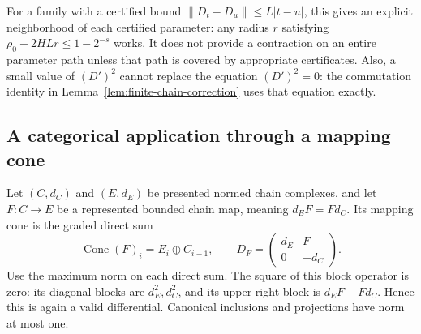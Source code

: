 For a family with a certified bound
$\|D_t-D_u\|\le L|t-u|$, this gives an explicit neighborhood of each
certified parameter: any radius $r$ satisfying
$\rho_0+2HLr\le1-2^{-s}$ works.  It does not provide a contraction
on an entire parameter path unless that path is covered by appropriate
certificates.  Also, a small value of $(D')^2$ cannot replace the equation
$(D')^2=0$: the commutation identity in
Lemma~\ref{lem:finite-chain-correction} uses that equation exactly.

\subsection{A categorical application through a mapping cone}

Let $(C,d_C)$ and $(E,d_E)$ be presented normed chain complexes, and let
$F:C\longrightarrow E$ be a represented bounded chain map, meaning
$d_EF=Fd_C$.  Its mapping cone is the graded direct sum
\[
 \operatorname{Cone}(F)_i=E_i\oplus C_{i-1},\qquad
 D_F=\begin{pmatrix}d_E&F\\0&-d_C\end{pmatrix}.
\]
Use the maximum norm on each direct sum.  The square of this block
operator is zero: its diagonal blocks are $d_E^2,d_C^2$, and its upper
right block is $d_EF-Fd_C$.  Hence this is again a valid differential.
Canonical inclusions and projections have norm at most one.

